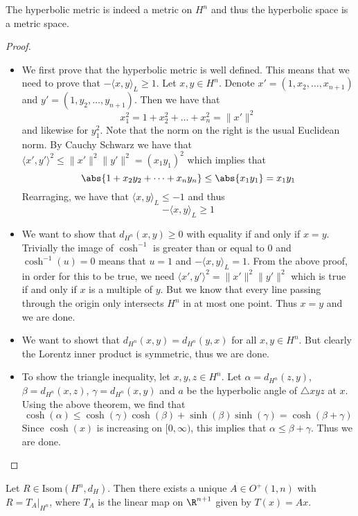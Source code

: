 \begin{thm}{}{} The hyperbolic metric is indeed a metric on $H^n$ and thus the hyperbolic space is a metric space. \tcbline
\begin{proof}~\\
\begin{itemize}
\item We first prove that the hyperbolic metric is well defined. This means that we need to prove that $-\langle x,y\rangle_L\geq 1$. Let $x,y\in H^n$. Denote $x'=(1,x_2,\dots,x_{n+1})$ and $y'=(1,y_2,\dots,y_{n+1})$. Then we have that $$x_1^2=1+x_2^2+\dots+x_n^2=\|x'\|^2$$ and likewise for $y_1^2$. Note that the norm on the right is the usual Euclidean norm. By Cauchy Schwarz we have that $\langle x',y'\rangle^2\leq\|x'\|^2\|y'\|^2=(x_1y_1)^2$ which implies that $$\abs{1+x_2y_2+\dots+x_ny_n}\leq\abs{x_1y_1}=x_1y_1$$ Rearraging, we have that $\langle x,y\rangle_L\leq -1$ and thus $$-\langle x,y\rangle_L\geq 1$$
\item We want to show that $d_{H^n}(x,y)\geq 0$ with equality if and only if $x=y$. Trivially the image of $\cosh^{-1}$ is greater than or equal to $0$ and $\cosh^{-1}(u)=0$ means that $u=1$ and $-\langle x,y\rangle_L=1$. From the above proof, in order for this to be true, we need $\langle x',y'\rangle^2=\|x'\|^2\|y'\|^2$ which is true if and only if $x$ is a multiple of $y$. But we know that every line passing through the origin only intersects $H^n$ in at most one point. Thus $x=y$ and we are done. 
\item We want to showt that $d_{H^n}(x,y)=d_{H^n}(y,x)$ for all $x,y\in H^n$. But clearly the Lorentz inner product is symmetric, thus we are done. 
\item To show the triangle inequality, let $x,y,z\in H^n$. Let $\alpha=d_{H^n}(z,y)$, $\beta=d_{H^n}(x,z)$, $\gamma=d_{H^n}(x,y)$ and $a$ be the hyperbolic angle of $\triangle xyz$ at $x$. Using the above theorem, we find that $$\cosh(\alpha)\leq\cosh(\gamma)\cosh(\beta)+\sinh(\beta)\sinh(\gamma)=\cosh(\beta+\gamma)$$ Since $\cosh(x)$ is increasing on $[0,\infty)$, this implies that $\alpha\leq\beta+\gamma$. Thus we are done. 
\end{itemize}
\end{proof}
\end{thm}

\begin{prp}{}{} Let $R\in\text{Isom}(H^n,d_H)$. Then there exists a unique $A\in O^+(1,n)$ with $R=T_A|_{H^n}$, where $T_A$ is the linear map on $\R^{n+1}$ given by $T(x)=Ax$. 
\end{prp}

